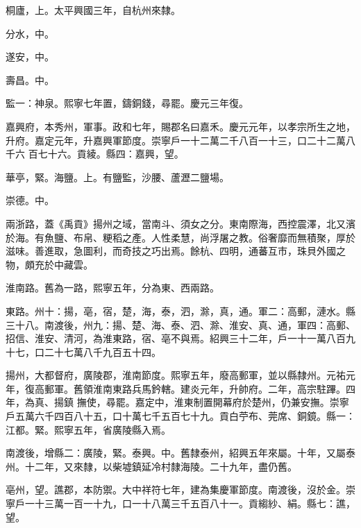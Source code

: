 \begin{pinyinscope}
 桐廬，上。太平興國三年，自杭州來隸。



 分水，中。



 遂安，中。



 壽昌。中。



 監一：神泉。熙寧七年置，鑄銅錢，尋罷。慶元三年復。



 嘉興府，本秀州，軍事。政和七年，賜郡名曰嘉禾。慶元元年，以孝宗所生之地，升府。嘉定元年，升嘉興軍節度。崇寧戶一十二萬二千八百一十三，口二十二萬八千六
 百七十六。貢綾。縣四：嘉興，望。



 華亭，緊。海鹽。上。有鹽監，沙腰、蘆瀝二鹽場。



 崇德。中。



 兩浙路，蓋《禹貢》揚州之域，當南斗、須女之分。東南際海，西控震澤，北又濱於海。有魚鹽、布帛、粳稻之產。人性柔慧，尚浮屠之教。俗奢靡而無積聚，厚於滋味。善進取，急圖利，而奇技之巧出焉。餘杭、四明，通蕃互市，珠貝外國之物，頗充於中藏雲。



 淮南路。舊為一路，熙寧五年，分為東、西兩路。



 東路。州十：揚，亳，宿，楚，海，泰，泗，滁，真，通。軍二：高郵，漣水。縣三十八。南渡後，州九：揚、楚、海、泰、泗、滁、淮安、真、通，軍四：高郵、招信、淮安、清河，為淮東路，宿、亳不與焉。紹興三十二年，戶一十一萬八百九十七，口二十七萬八千九百五十四。



 揚州，大都督府，廣陵郡，淮南節度。熙寧五年，廢高郵軍，並以縣隸州。元祐元年，復高郵軍。舊領淮南東路兵馬鈐轄。建炎元年，升帥府。二年，高宗駐蹕。四年，為真、揚鎮
 撫使，尋罷。嘉定中，淮東制置開幕府於楚州，仍兼安撫。崇寧戶五萬六千四百八十五，口十萬七千五百七十九。貢白苧布、莞席、銅鏡。縣一：江都。緊。熙寧五年，省廣陵縣入焉。



 南渡後，增縣二：廣陵，緊。泰興。中。舊隸泰州，紹興五年來屬。十年，又屬泰州。十二年，又來隸，以柴墟鎮延冷村隸海陵。二十九年，盡仍舊。



 亳州，望。譙郡，本防禦。大中祥符七年，建為集慶軍節度。南渡後，沒於金。崇寧戶一十三萬一百一十九，口一十八萬三千五百八十一。貢縐紗、絹。縣七：譙，望。




\end{pinyinscope}
